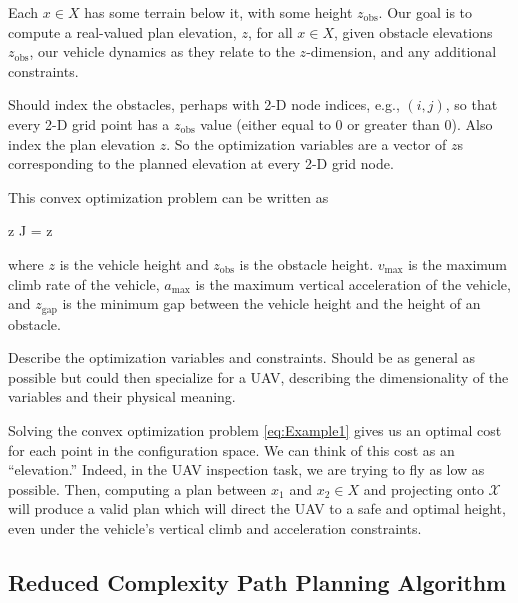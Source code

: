 \documentclass[letterpaper, 12pt]{article}
\def\startmodif{\color{blue}}
\def\stopmodif{\color{black}\normalcolor}
\newcommand{\dac}[1]{\color{red}#1}
\begin{document}
Each $x \in X$ has some terrain below it, with some height $z_\text{obs}$. Our goal is to compute a real-valued plan elevation, $z$, for all $x \in X$, given obstacle elevations $z_\text{obs}$, our vehicle dynamics as they relate to the $z$-dimension, and any additional constraints.

{\dac Should index the obstacles, perhaps with 2-D node indices, e.g., $(i,j)$, so that every 2-D grid point has a $z_\text{obs}$ value (either equal to 0 or greater than 0). Also index the plan elevation $z$. So the optimization variables are a vector of $z$s corresponding to the planned elevation at every 2-D grid node.}

This convex optimization problem can be written as \stopmodif
\begin{mini!}
    {\startmodif z \stopmodif}{J = z}
    {\label{eq:Example1}}
    {}
\end{mini!}
where $z$ is the vehicle height and $z_\text{obs}$ is the obstacle height. $v_\text{max}$ is the maximum climb rate of the vehicle, $a_\text{max}$ is the maximum vertical acceleration of the vehicle, and $z_\text{gap}$ is the minimum gap between the vehicle height and the height of an obstacle.

{\dac Describe the optimization variables and constraints. Should be as general as possible but could then specialize for a UAV, describing the dimensionality of the variables and their physical meaning.}

\startmodif Solving the convex optimization problem \eqref{eq:Example1} \stopmodif gives us an optimal cost for each point in the configuration space. We can think of this cost as an ``elevation.'' Indeed, in the UAV inspection task, we are trying to fly as low as possible. Then, computing a plan between $x_1$ and $x_2 \in X$ and projecting onto $\mathcal{X}$ will produce a valid plan which will direct the UAV to a safe and optimal height, even under the vehicle's vertical climb and acceleration constraints.

\subsection{\startmodif Reduced Complexity Path Planning Algorithm \stopmodif}
\end{document}
